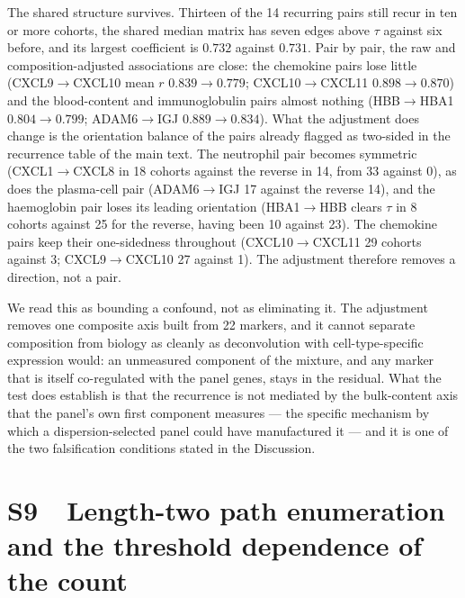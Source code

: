 \documentclass[11pt]{article}
\begin{document}
The shared structure survives. Thirteen of the 14 recurring pairs still recur in ten or more cohorts, the shared median matrix has seven edges above $\tau$ against six before, and its largest coefficient is $0.732$ against $0.731$. Pair by pair, the raw and composition-adjusted associations are close: the chemokine pairs lose little (CXCL9$\rightarrow$CXCL10 mean $r$ $0.839 \rightarrow 0.779$; CXCL10$\rightarrow$CXCL11 $0.898 \rightarrow 0.870$) and the blood-content and immunoglobulin pairs almost nothing (HBB$\rightarrow$HBA1 $0.804 \rightarrow 0.799$; ADAM6$\rightarrow$IGJ $0.889 \rightarrow 0.834$). What the adjustment does change is the orientation balance of the pairs already flagged as two-sided in the recurrence table of the main text. The neutrophil pair becomes symmetric (CXCL1$\rightarrow$CXCL8 in 18 cohorts against the reverse in 14, from 33 against 0), as does the plasma-cell pair (ADAM6$\rightarrow$IGJ 17 against the reverse 14), and the haemoglobin pair loses its leading orientation (HBA1$\rightarrow$HBB clears $\tau$ in 8 cohorts against 25 for the reverse, having been 10 against 23). The chemokine pairs keep their one-sidedness throughout (CXCL10$\rightarrow$CXCL11 29 cohorts against 3; CXCL9$\rightarrow$CXCL10 27 against 1). The adjustment therefore removes a direction, not a pair.

We read this as bounding a confound, not as eliminating it. The adjustment removes one composite axis built from 22 markers, and it cannot separate composition from biology as cleanly as deconvolution with cell-type-specific expression would: an unmeasured component of the mixture, and any marker that is itself co-regulated with the panel genes, stays in the residual. What the test does establish is that the recurrence is not mediated by the bulk-content axis that the panel's own first component measures --- the specific mechanism by which a dispersion-selected panel could have manufactured it --- and it is one of the two falsification conditions stated in the Discussion.

\section*{S9\ \ Length-two path enumeration and the threshold dependence of the count}
\end{document}
